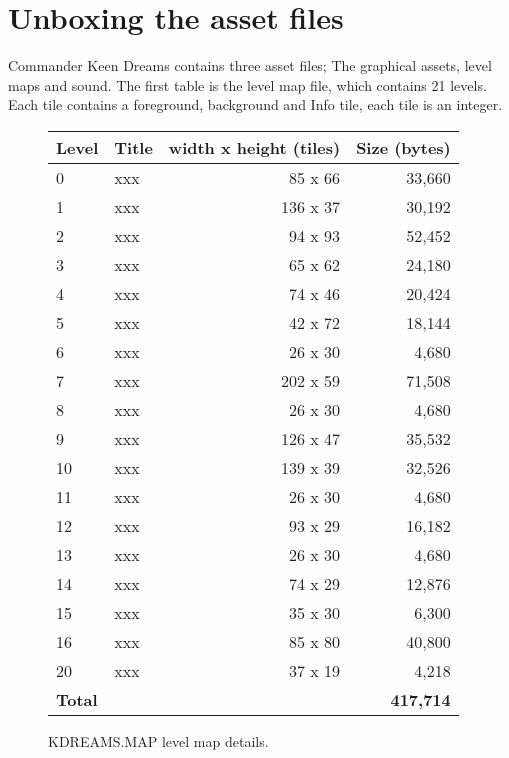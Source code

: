 \documentclass[book.tex]{subfiles}
\begin{document}
\label{asset_details}
\section{Unboxing the asset files}

Commander Keen Dreams contains three asset files; The graphical assets, level maps and sound. The first table is the level map file, which contains 21 levels. Each tile contains a foreground, background and Info tile, each tile is an integer. 

\begin{figure}[H]
\centering
{\renewcommand{\arraystretch}{1.2} %
\begin{tabularx}{\textwidth}[c]{|X|X|r|r|}
  \hline
  \textbf{Level} & \textbf{Title} & \textbf{width x height (tiles)} & \textbf{Size (bytes)}\\ \hline
	0 & xxx & 85 x 66 &  33,660 \\
	1 & xxx & 136 x 37 &   30,192 \\ 
	2 & xxx & 94 x 93 &   52,452 \\
	3 & xxx & 65 x 62 &  24,180 \\
	4 & xxx & 74 x 46 &  20,424 \\
	5 & xxx & 42 x 72 &   18,144 \\
	6 & xxx & 26 x 30 &   4,680 \\
	7 & xxx & 202 x 59 &  71,508 \\
	8 & xxx & 26 x 30 &  4,680 \\
	9 & xxx & 126 x 47 &  35,532 \\
	10 & xxx & 139 x 39 &  32,526 \\
	11 & xxx & 26 x 30 &  4,680 \\
	12 & xxx & 93 x 29 &  16,182 \\
	13 & xxx & 26 x 30 &  4,680 \\
	14 & xxx & 74 x 29 &  12,876 \\
	15 & xxx & 35 x 30 &  6,300 \\
	16 & xxx & 85 x 80 &  40,800 \\
	20 & xxx & 37 x 19 &  4,218 \\ \hline
	\textbf{Total} & \multicolumn{3}{r|}{\textbf{417,714}} \\ \hline
\end{tabularx}
}
\caption{KDREAMS.MAP level map details.}
\end{figure}
\end{document}
